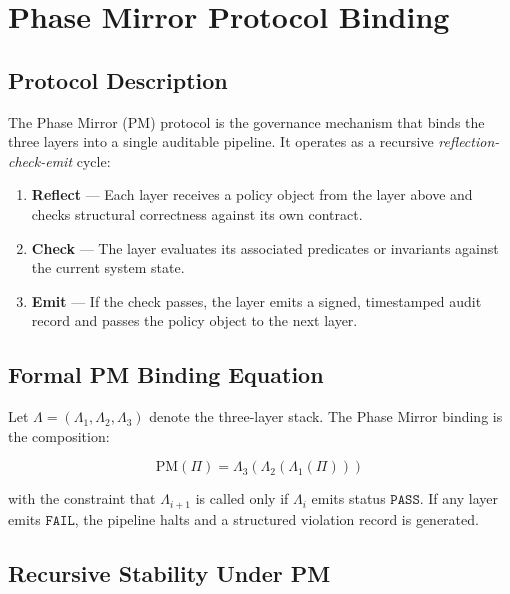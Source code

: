 \documentclass[12pt,letterpaper]{article}
\theoremstyle{definition}
\theoremstyle{plain}
\theoremstyle{remark}
\begin{document}
\section{Phase Mirror Protocol Binding}
\label{sec:phasemirror}

\subsection{Protocol Description}

The Phase Mirror (PM) protocol is the governance mechanism that binds the three
layers into a single auditable pipeline. It operates as a recursive
\emph{reflection-check-emit} cycle:

\begin{enumerate}
  \item \textbf{Reflect} --- Each layer receives a policy object from the layer
  above and checks structural correctness against its own contract.
  \item \textbf{Check} --- The layer evaluates its associated predicates or
  invariants against the current system state.
  \item \textbf{Emit} --- If the check passes, the layer emits a signed, timestamped
  audit record and passes the policy object to the next layer.
\end{enumerate}

\subsection{Formal PM Binding Equation}

Let $\Lambda = (\Lambda_1, \Lambda_2, \Lambda_3)$ denote the three-layer stack.
The Phase Mirror binding is the composition:

\begin{equation}
\text{PM}(\Pi) = \Lambda_3\!\left(\Lambda_2\!\left(\Lambda_1(\Pi)\right)\right)
\label{eq:pmbind}
\end{equation}

with the constraint that $\Lambda_{i+1}$ is called only if $\Lambda_i$ emits
status $\texttt{PASS}$. If any layer emits $\texttt{FAIL}$, the pipeline halts
and a structured violation record is generated.

\subsection{Recursive Stability Under PM}
\end{document}

